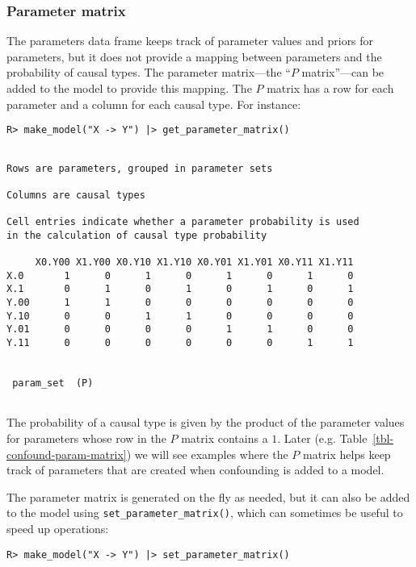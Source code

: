\documentclass[
  11pt,
  article]{jss}
\begin{document}
\hypertarget{parameter-matrix}{%
\subsubsection{Parameter matrix}\label{parameter-matrix}}

The parameters data frame keeps track of parameter values and priors for
parameters, but it does not provide a mapping between parameters and the
probability of causal types. The parameter matrix---the ``\(P\)
matrix''---can be added to the model to provide this mapping. The \(P\)
matrix has a row for each parameter and a column for each causal type.
For instance:

\begin{verbatim}
R> make_model("X -> Y") |> get_parameter_matrix()
\end{verbatim}

\begin{verbatim}

Rows are parameters, grouped in parameter sets

Columns are causal types

Cell entries indicate whether a parameter probability is used
in the calculation of causal type probability

     X0.Y00 X1.Y00 X0.Y10 X1.Y10 X0.Y01 X1.Y01 X0.Y11 X1.Y11
X.0       1      0      1      0      1      0      1      0
X.1       0      1      0      1      0      1      0      1
Y.00      1      1      0      0      0      0      0      0
Y.10      0      0      1      1      0      0      0      0
Y.01      0      0      0      0      1      1      0      0
Y.11      0      0      0      0      0      0      1      1

 
 param_set  (P)
 
\end{verbatim}

The probability of a causal type is given by the product of the
parameter values for parameters whose row in the \(P\) matrix contains a
\(1\). Later (e.g. Table~\ref{tbl-confound-param-matrix}) we will see
examples where the \(P\) matrix helps keep track of parameters that are
created when confounding is added to a model.

The parameter matrix is generated on the fly as needed, but it can also
be added to the model using \texttt{set\_parameter\_matrix()}, which can
sometimes be useful to speed up operations:

\begin{verbatim}
R> make_model("X -> Y") |> set_parameter_matrix()
\end{verbatim}
\end{document}
